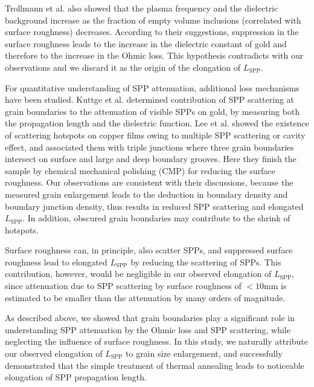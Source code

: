 \documentclass[aip,apl,reprint]{revtex4-1}
\begin{document}
Trollmann et al. also showed that the plasma frequency and the dielectric background increase as the fraction of empty volume inclusions (correlated with surface roughness) decreases. According to their suggestions, suppression in the surface roughness leads to the increase in the dielectric constant of gold and therefore to the increase in the Ohmic loss. This hypothesis contradicts with our observations and we discard it as the origin of the elongation of $L_{\mathrm{SPP}}$. 

For quantitative understanding of SPP attenuation, additional loss mechanisms have been studied. 
Kuttge et al.\cite{Kuttge} determined contribution of SPP scattering at grain boundaries to the attenuation of visible SPPs on gold, by measuring both the propagation length and the dielectric function. 
Lee et al.\cite{Lee} showed the existence of scattering hotspots on copper films owing to multiple SPP scattering or cavity effect, and associated them with triple junctions where three grain boundaries intersect on surface and large and deep boundary grooves. Here they finish the sample by chemical mechanical polishing (CMP) for reducing the surface roughness. 
Our observations are consistent with their discussions, because the measured grain enlargement leads to the deduction in boundary density and boundary junction density, thus results in reduced SPP scattering and elongated $L_{\mathrm{SPP}}$. In addition, obscured grain boundaries may contribute to the shrink of hotspots. 
 
Surface roughness can, in principle, also scatter SPPs, and suppressed surface roughness lead to elongated $L_{\mathrm{SPP}}$ by reducing the scattering of SPPs. This contribution, however, would be negligible in our observed elongation of $L_{\mathrm{SPP}}$, since attenuation due to SPP scattering by surface roughness of $<10 \mathrm{mm}$ is estimated to be smaller than the attenuation by many orders of magnitude\cite{Shiba, Kuttge, Mills}.

As described above, we showed that grain boundaries play a significant role in understanding SPP attenuation by the Ohmic loss and SPP scattering, while neglecting the influence of surface roughness. In this study, we naturally attribute our observed elongation of $L_{\mathrm{SPP}}$ to grain size enlargement, and successfully demonstrated that the simple treatment of thermal annealing leads to noticeable elongation of SPP propagation length. 
\end{document}
